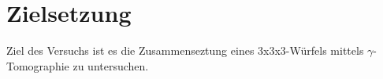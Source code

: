 \section{Zielsetzung}
\label{sec:Zielsetzung}

Ziel des Versuchs ist es die Zusammenseztung eines 3x3x3-Würfels mittels $\gamma$-Tomographie zu untersuchen.